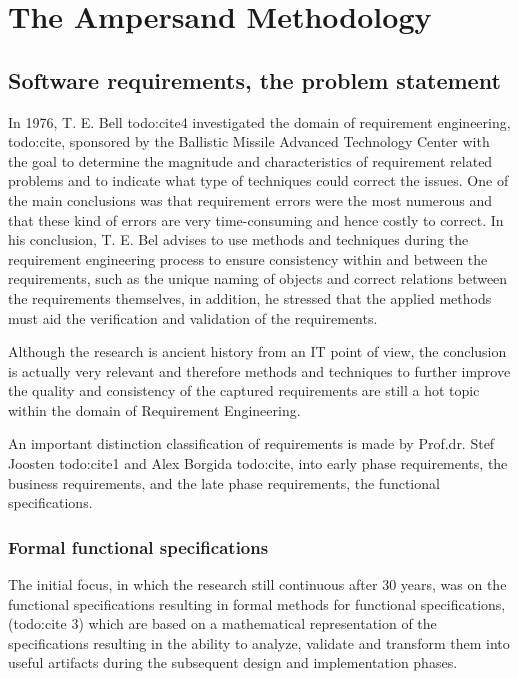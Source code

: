 
\section{The Ampersand Methodology}
\label{sec:AmpersandApproach}

\subsection{Software requirements, the problem statement}
%
%
%

In 1976,  T. E. Bell todo:cite4 investigated the domain of requirement engineering, todo:cite, sponsored by the Ballistic Missile Advanced Technology Center with the goal to determine the magnitude and characteristics of requirement related problems and to indicate what type of techniques could correct the issues. One of the main conclusions was that requirement errors were the most numerous and that these kind of errors are very time-consuming and hence costly to correct.
In his conclusion,  T. E. Bel advises to use methods and techniques during the requirement engineering process to ensure consistency within and  between the requirements, such as the unique naming of objects and correct relations between the requirements themselves, in addition, he stressed that the applied methods must aid the verification and validation of the requirements.
 
Although the research is ancient history from an IT point of view, the conclusion is actually very relevant and therefore methods and techniques to further improve the quality and consistency of the captured requirements are still a hot topic within the domain of Requirement Engineering.

An important distinction classification of requirements is made by  Prof.dr. Stef Joosten todo:cite1 and Alex Borgida todo:cite, into early phase requirements, the business requirements, and the late phase requirements, the functional specifications. 

\subsubsection{Formal functional specifications}
The initial focus, in which the research still continuous after 30 years, was on the functional specifications resulting in formal methods for functional specifications, (todo:cite 3) which are based on a mathematical representation of the specifications resulting in the ability to analyze, validate and transform them into useful artifacts during the subsequent design and implementation phases. 

